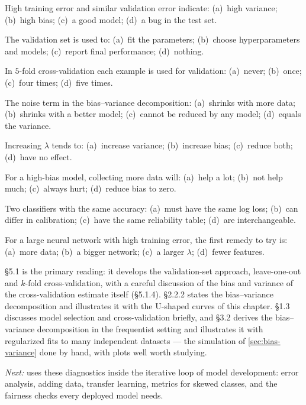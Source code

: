 
\qz High training error and similar validation error indicate: (a)~high
variance; (b)~high bias; (c)~a good model; (d)~a bug in the test set.

\qz The validation set is used to: (a)~fit the parameters; (b)~choose
hyperparameters and models; (c)~report final performance; (d)~nothing.

\qz In $5$-fold cross-validation each example is used for validation: (a)~never;
(b)~once; (c)~four times; (d)~five times.

\qz The noise term in the bias--variance decomposition: (a)~shrinks with more
data; (b)~shrinks with a better model; (c)~cannot be reduced by any model;
(d)~equals the variance.

\qz Increasing $\lambda$ tends to: (a)~increase variance; (b)~increase bias;
(c)~reduce both; (d)~have no effect.

\qz For a high-bias model, collecting more data will: (a)~help a lot;
(b)~not help much; (c)~always hurt; (d)~reduce bias to zero.

\qz Two classifiers with the same accuracy: (a)~must have the same log loss;
(b)~can differ in calibration; (c)~have the same reliability table; (d)~are
interchangeable.

\qz For a large neural network with high training error, the first remedy to try
is: (a)~more data; (b)~a bigger network; (c)~a larger $\lambda$; (d)~fewer
features.

\furtherreading

\textcite{james2021} §5.1 is the primary reading: it develops the validation-set
approach, leave-one-out and $k$-fold cross-validation, with a careful discussion
of the bias and variance of the cross-validation estimate itself (§5.1.4).
§2.2.2 states the bias--variance decomposition and illustrates it with the
U-shaped curves of this chapter. \textcite{bishop2006} §1.3 discusses model
selection and cross-validation briefly, and §3.2 derives the bias--variance
decomposition in the frequentist setting and illustrates it with regularized
fits to many independent datasets --- the simulation of \cref{sec:bias-variance}
done by hand, with plots well worth studying.

\bigskip
\noindent\emph{Next:}  uses these diagnostics inside the iterative
loop of model development: error analysis, adding data, transfer learning,
metrics for skewed classes, and the fairness checks every deployed model needs.
